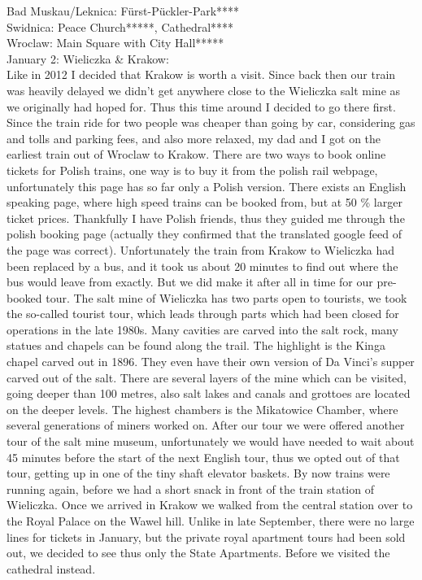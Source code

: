 Bad Muskau/Leknica: F\"urst-P\"uckler-Park****\\
Swidnica: Peace Church*****, Cathedral****\\
Wroclaw: Main Square with City Hall*****\\

January 2: Wieliczka \& Krakow:\\
Like in 2012 I decided that Krakow is worth a visit. Since back then our train was heavily delayed we didn't get anywhere close to the Wieliczka salt mine as we originally had hoped for. Thus this time around I decided to go there first. Since the train ride for two people was cheaper than going by car, considering gas and tolls and parking fees, and also more relaxed, my dad and I got on the earliest train out of Wroclaw to Krakow. There are two ways to book online tickets for Polish trains, one way is to buy it from the polish rail webpage, unfortunately this page has so far only a Polish version. There exists an English speaking page, where high speed trains can be booked from, but at 50 \% larger ticket prices. Thankfully I have Polish friends, thus they guided me through the polish booking page (actually they confirmed that the translated google feed of the page was correct). Unfortunately the train from Krakow to Wieliczka had been replaced by a bus, and it took us about 20 minutes to find out where the bus would leave from exactly. But we did make it after all in time for our pre-booked tour. The salt mine of Wieliczka has two parts open to tourists, we took the so-called tourist tour, which leads through parts which had been closed for operations in the late 1980s. Many cavities are carved into the salt rock, many statues and chapels can be found along the trail. The highlight is the Kinga chapel carved out in 1896. They even have their own version of Da Vinci's supper carved out of the salt. There are several layers of the mine which can be visited, going deeper than 100 metres, also salt lakes and canals and grottoes are located on the deeper levels. The highest chambers is the Mikatowice Chamber, where several generations of miners worked on. After our tour we were offered another tour of the salt mine museum, unfortunately we would have needed to wait about 45 minutes before the start of the next English tour, thus we opted out of that tour, getting up in one of the tiny shaft elevator baskets. By now trains were running again, before we had a short snack in front of the train station of Wieliczka. Once we arrived in Krakow we walked from the central station over to the Royal Palace on the Wawel hill. Unlike in late September, there were no large lines for tickets in January, but the private royal apartment tours had been sold out, we decided to see thus only the State Apartments. Before we visited the cathedral instead.\\

